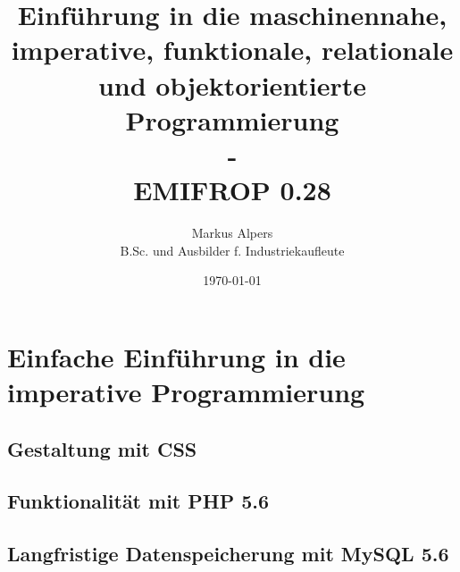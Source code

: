 \documentclass[11pt, a4paper, oneside, draft]{book}
\begin{document}

\title{Einführung in die maschinennahe, imperative, funktionale, relationale und objektorientierte Programmierung\\-\\EMIFROP 0.28}
\author{Markus Alpers\\B.Sc. und Ausbilder f. Industriekaufleute}
\date{\today}

\maketitle


\tableofcontents




\part{Einfache Einführung in die imperative Programmierung}








%
\chapter{Gestaltung mit CSS}
%
\chapter{Funktionalität mit PHP 5.6}
%
\chapter{Langfristige Datenspeicherung mit MySQL 5.6}


%

%
\end{document}
